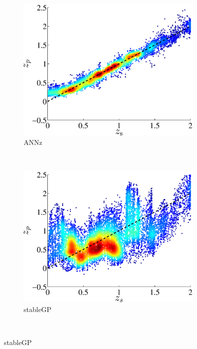 \documentclass[useAMS,usenatbib,fleqn]{mn2e}
\begin{document}
\begin{figure}
        \centering
        \begin{subfigure}[b]{0.3\textwidth}
                \includegraphics[width=\textwidth]{figures/ANN.eps}
                \caption{{\sc ANNz}}
                \label{annz-plot}
        \end{subfigure}
        ~
        \begin{subfigure}[b]{0.3\textwidth}
                \includegraphics[width=\textwidth]{figures/stableGP.eps}
                \caption{{\sc stableGP}}
                \label{stableGP-plot}
        \end{subfigure}
        ~

\end{figure}
\end{document}
